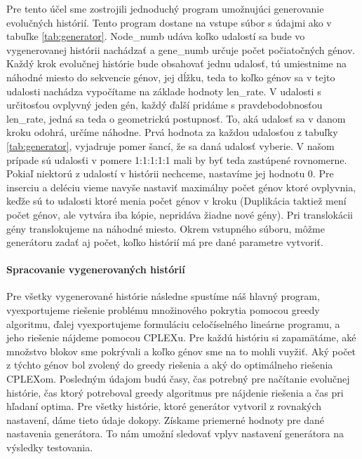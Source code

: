 Pre tento účel sme zostrojili jednoduchý program umožnujúci generovanie evolučných histórií.
Tento program dostane na vstupe súbor s údajmi ako v tabuľke \ref{tab:generator}. Node\_numb udáva koľko udalostí sa bude vo vygenerovanej histórii nachádzať
a gene\_numb určuje počet počiatočných génov. Každý krok evolučnej histórie bude obsahovať jednu udalosť, tú umiestnime na náhodné miesto do sekvencie génov,
jej dĺžku, teda to koľko génov sa v tejto udalosti nachádza vypočítame na základe hodnoty len\_rate. V udalosti s určitosťou ovplyvný jeden gén,
každý ďalší pridáme s pravdebodobnosťou len\_rate, jedná sa teda o geometrickú postupnosť. To, aká udalosť sa v danom kroku odohrá, určíme náhodne.
Prvá hodnota za každou udalosťou z tabuľky \ref{tab:generator}, vyjadruje pomer šancí, že sa daná udalosť vyberie. V našom prípade sú udalosťi v pomere 1:1:1:1:1 mali by byť teda zastúpené rovnomerne.
Pokiaľ niektorú z udalostí v histórii nechceme, nastavíme jej hodnotu 0. Pre inserciu a deléciu vieme navyše nastaviť maximálny počet génov ktoré ovplyvnia, 
keďže sú to udalosti ktoré menia počet génov v kroku (Duplikácia taktiež mení počet génov, ale vytvára iba kópie, nepridáva žiadne nové gény).
Pri translokácii gény translokujeme na náhodné miesto.
Okrem vstupného súboru, môžme generátoru zadať aj počet, koľko histórií má pre dané parametre vytvoriť.
\paragraph{Spracovanie vygenerovaných histórií}
Pre všetky vygenerované histórie následne spustíme náš hlavný program, vyexportujeme riešenie problému množinového pokrytia pomocou greedy algoritmu,
ďalej vyexportujeme formuláciu celočíselného lineárne programu, a jeho riešenie nájdeme pomocou CPLEXu.
Pre každú históriu si zapamätáme, aké množstvo blokov sme pokrývali a koľko génov sme na to mohli vuyžiť.
Aký počet z týchto génov bol zvolený do greedy riešenia a aký do optimálneho riešenia CPLEXom.
Posledným údajom budú časy, čas potrebný pre načítanie evolučnej histórie, čas ktorý potreboval greedy algoritmus pre nájdenie riešenia a čas pri hľadaní optima.
Pre všetky histórie, ktoré generátor vytvoril z rovnakých nastavení, dáme tieto údaje dokopy. Získame priemerné hodnoty pre dané nastavenia generátora. 
To nám umožní sledovať vplyv nastavení generátora na výsledky testovania.
